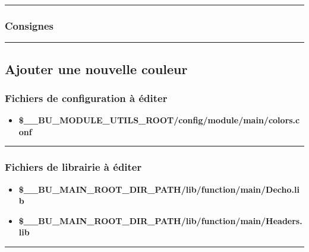 \documentclass[a4paper,10pt]{article}
\begin{document}

\color{blue}\par\noindent\rule{\textwidth}{0.4pt}\color{white}

\color{blue}
\subsubsection{Consignes}\color{white}



\color{green}\par\noindent\rule{\textwidth}{0.4pt}\color{white}

\color{green}
\subsection{Ajouter une nouvelle couleur}\color{white}

\color{blue}
\subsubsection{Fichiers de configuration à éditer}\color{white}
\begin{itemize}
    \item \textbf{\color{orange}\$\_\_BU\_MODULE\_UTILS\_ROOT\color{lime}/config/module/main/colors.conf}
\end{itemize}



\color{blue}\par\noindent\rule{\textwidth}{0.4pt}\color{white}

\color{blue}
\subsubsection{Fichiers de librairie à éditer}\color{white}
\begin{itemize}
    \item \textbf{\color{orange}\$\_\_BU\_MAIN\_ROOT\_DIR\_PATH\color{lime}/lib/function/main/Decho.lib}
    \item \textbf{\color{orange}\$\_\_BU\_MAIN\_ROOT\_DIR\_PATH\color{lime}/lib/function/main/Headers.lib}
\end{itemize}



\color{blue}\par\noindent\rule{\textwidth}{0.4pt}\color{white}
\end{document}
